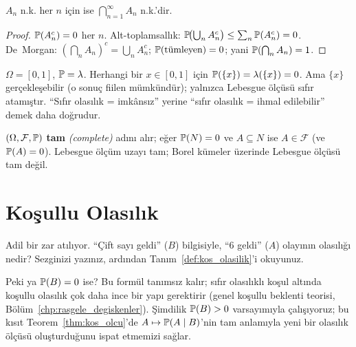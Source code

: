\begin{onerme}\label{prop:nk_birlesim}
$A_n$ n.k. her $n$ için ise $\bigcap_{n=1}^\infty A_n$ n.k.'dir.
\end{onerme}

\begin{proof}
$\mathbb{P}(A_n^c) = 0$ her $n$. Alt-toplamsallık:
$\mathbb{P}\!\bigl(\bigcup_n A_n^c\bigr) \leq \sum_n \mathbb{P}(A_n^c) = 0$.
De~Morgan: $\left(\bigcap_n A_n\right)^c = \bigcup_n A_n^c$; $\mathbb{P}(\text{tümleyen}) = 0$;
yani $\mathbb{P}(\bigcap_n A_n) = 1$.
\end{proof}

\begin{hataanalizi}
$\Omega = [0,1]$, $\mathbb{P} = \lambda$. Herhangi bir $x \in [0,1]$ için
$\mathbb{P}(\{x\}) = \lambda(\{x\}) = 0$. Ama $\{x\}$ gerçekleşebilir
(o sonuç fiilen mümkündür); yalnızca Lebesgue ölçüsü sıfır atamıştır.
``Sıfır olasılık = imkânsız'' yerine ``sıfır olasılık = ihmal edilebilir'' demek daha doğrudur.
\end{hataanalizi}

\begin{tanim}\label{def:tamuzay}
$(\Omega,\mathcal{F},\mathbb{P})$ \textbf{tam} \emph{(complete)} adını alır; eğer
$\mathbb{P}(N)=0$ ve $A \subseteq N$ ise $A \in \mathcal{F}$ (ve $\mathbb{P}(A)=0$).
Lebesgue ölçüm uzayı tam; Borel kümeler üzerinde Lebesgue ölçüsü tam değil.
\end{tanim}


\section{Koşullu Olasılık}

\begin{kesif}
Adil bir zar atılıyor. ``Çift sayı geldi'' ($B$) bilgisiyle, ``6 geldi'' ($A$)
olayının olasılığı nedir? Sezginizi yazınız, ardından Tanım~\ref{def:kos_olasilik}'i okuyunuz.
\end{kesif}

\begin{tanimgerekce}
Peki ya $\mathbb{P}(B) = 0$ ise? Bu formül tanımsız kalır; sıfır olasılıklı koşul
altında koşullu olasılık çok daha ince bir yapı gerektirir (genel koşullu beklenti
teorisi, Bölüm~\ref{chp:rasgele_degiskenler}). Şimdilik $\mathbb{P}(B) > 0$ varsayımıyla
çalışıyoruz; bu kısıt Teorem~\ref{thm:kos_olcu}'de $A \mapsto \mathbb{P}(A \mid B)$'nin
tam anlamıyla yeni bir olasılık ölçüsü oluşturduğunu ispat etmemizi sağlar.
\end{tanimgerekce}

